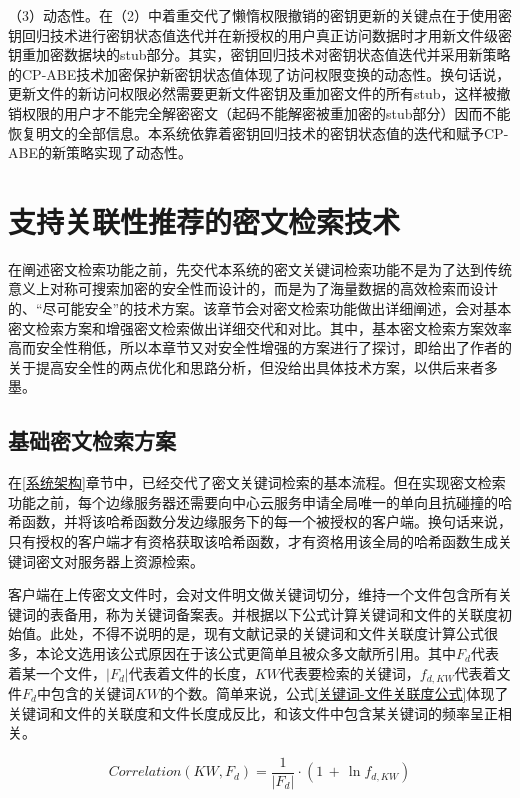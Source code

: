 \documentclass[promaster]{thesis-uestc}
\begin{document}
（3）动态性。在（2）中着重交代了懒惰权限撤销的密钥更新的关键点在于使用密钥回归技术进行密钥状态值迭代并在新授权的用户真正访问数据时才用新文件级密钥重加密数据块的stub部分。其实，密钥回归技术对密钥状态值迭代并采用新策略的CP-ABE技术加密保护新密钥状态值体现了访问权限变换的动态性。换句话说，更新文件的新访问权限必然需要更新文件密钥及重加密文件的所有stub，这样被撤销权限的用户才不能完全解密密文（起码不能解密被重加密的stub部分）因而不能恢复明文的全部信息。本系统依靠着密钥回归技术的密钥状态值的迭代和赋予CP-ABE的新策略实现了动态性。


\section{支持关联性推荐的密文检索技术}\label{keyword_search}
在阐述密文检索功能之前，先交代本系统的密文关键词检索功能不是为了达到传统意义上对称可搜索加密的安全性而设计的，而是为了海量数据的高效检索而设计的、“尽可能安全”的技术方案。该章节会对密文检索功能做出详细阐述，会对基本密文检索方案和增强密文检索做出详细交代和对比。其中，基本密文检索方案效率高而安全性稍低，所以本章节又对安全性增强的方案进行了探讨，即给出了作者的关于提高安全性的两点优化和思路分析，但没给出具体技术方案，以供后来者多墨。
\subsection{基础密文检索方案}\label{基础密文检索方案}
在\ref{系统架构}章节中，已经交代了密文关键词检索的基本流程。但在实现密文检索功能之前，每个边缘服务器还需要向中心云服务申请全局唯一的单向且抗碰撞的哈希函数，并将该哈希函数分发边缘服务下的每一个被授权的客户端。换句话来说，只有授权的客户端才有资格获取该哈希函数，才有资格用该全局的哈希函数生成关键词密文对服务器上资源检索。

客户端在上传密文文件时，会对文件明文做关键词切分，维持一个文件包含所有关键词的表备用，称为关键词备案表。并根据以下公式计算关键词和文件的关联度初始值。此处，不得不说明的是，现有文献记录的关键词和文件关联度计算公式很多，本论文选用该公式原因在于该公式更简单且被众多文献所引用。其中$F_d$代表着某一个文件，$|F_d|$代表着文件的长度，$KW$代表要检索的关键词，$f_{d,KW}$代表着文件$F_d$中包含的关键词$KW$的个数。简单来说，公式\ref{关键词-文件关联度公式}体现了关键词和文件的关联度和文件长度成反比，和该文件中包含某关键词的频率呈正相关。

\begin{equation}
    Correlation(KW, F_d) = \frac{1}{|F_d|} \cdot (1\,+\,\ln{f_{d,KW}})
    \label{关键词-文件关联度公式}
\end{equation}
\end{document}
